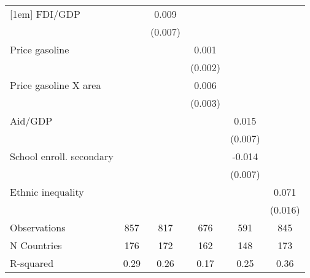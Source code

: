 {\begin{tabular}{l*{5}{c}}
[1em]
FDI/GDP             &                     &       0.009         &                     &                     &                     \\
                    &                     &     (0.007)         &                     &                     &                     \\
[1em]
Price gasoline      &                     &                     &       0.001         &                     &                     \\
                    &                     &                     &     (0.002)         &                     &                     \\
[1em]
Price gasoline X area&                     &                     &       0.006\sym{**} &                     &                     \\
                    &                     &                     &     (0.003)         &                     &                     \\
[1em]
Aid/GDP             &                     &                     &                     &       0.015\sym{**} &                     \\
                    &                     &                     &                     &     (0.007)         &                     \\
[1em]
School enroll. secondary&                     &                     &                     &      -0.014\sym{*}  &                     \\
                    &                     &                     &                     &     (0.007)         &                     \\
[1em]
Ethnic inequality   &                     &                     &                     &                     &       0.071\sym{***}\\
                    &                     &                     &                     &                     &     (0.016)         \\
\hline
Observations        &         857         &         817         &         676         &         591         &         845         \\
N Countries         &         176         &         172         &         162         &         148         &         173         \\
R-squared           &        0.29         &        0.26         &        0.17         &        0.25         &        0.36         \\

\end{tabular}}
